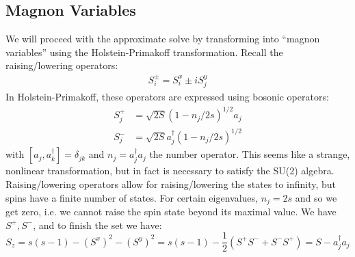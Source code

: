 \subsection{Magnon Variables}
We will proceed with the approximate solve by transforming into ``magnon variables'' using the Holstein-Primakoff transformation. Recall the raising/lowering operators:
\begin{align*}
    S_i^\pm = S_i^x \pm i S_j^y
\end{align*}
In Holstein-Primakoff, these operators are expressed using bosonic operators:
\begin{equation}\label{eq-HPtransSplusminus}
    \begin{split}
        S_j^+ &= \sqrt{2S}(1 - n_j/2s)^{1/2}a_j
        \\ S_j^- &= \sqrt{2S}a_j^\dag(1-n_j/2s)^{1/2}
    \end{split}
\end{equation} 
with $[a_j, a_k^\dag] = \delta_{jk}$ and $n_j = a^\dag_j a_j$ the number operator. This seems like a strange, nonlinear transformation, but in fact is necessary to satisfy the SU(2) algebra. Raising/lowering operators allow for raising/lowering the states to infinity, but spins have a finite number of states. For certain eigenvalues, $n_j = 2s$ and so we get zero, i.e. we cannot raise the spin state beyond its maximal value. We have $S^+, S^-$, and to finish the set we have:
\begin{equation}\label{eq-HPtransSz}
    S_z = s(s-1) - (S^x)^2 - (S^y)^2 = s(s-1) - \frac{1}{2}(S^+S^- + S^-S^+) = S - a_j^\dag a_j
\end{equation}

